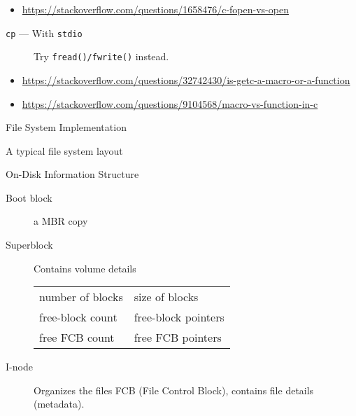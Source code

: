 \begin{itemize}
\item \url{https://stackoverflow.com/questions/1658476/c-fopen-vs-open}
\end{itemize}

\begin{frame}{\texttt{cp} --- {\small With} \texttt{stdio}}
  \begin{center}
  \end{center}
  \begin{description}
  \item[\hw] Try \texttt{fread()/fwrite()} instead.
  \end{description}
\end{frame}

\begin{itemize}
\item \url{https://stackoverflow.com/questions/32742430/is-getc-a-macro-or-a-function}
\item \url{https://stackoverflow.com/questions/9104568/macro-vs-function-in-c}
\end{itemize}

\begin{frame}{File System Implementation}
  \begin{block}{A typical file system layout}
    \begin{center}
    \end{center}
  \end{block}
  \begin{center}
  \end{center}
\end{frame}

\begin{frame}{On-Disk Information Structure}
  \begin{description}
  \item[Boot block] a MBR copy
  \item[Superblock] Contains volume details
    \begin{center}
      \begin{tabular}{ll}
        number of blocks& size of blocks\\
        free-block count& free-block pointers\\
        free FCB count& free FCB pointers
      \end{tabular}
    \end{center}
  \item[I-node] Organizes the files \alert{FCB (File Control Block)},
    contains file details (metadata).
  \end{description}
\end{frame}


